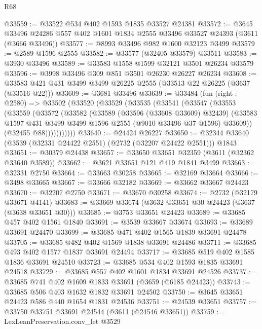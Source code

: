 \begin{lexlean}{R68}
\begin{coremodule}
@33559 := @33522 @534 @402 @1593 @1835 @33527 @24381
@33572 := @3645
    @33496
    @24286
    @557
    @402
    @1601
    @1834
    @2555
    @33496
    @33527
    @24393
    (@3611 (@3666 @33496))
@33577 := @8993 @33496 @982 @1600 @32123 @3499
@33579 := @2589 @1596 @2555
@33582 := @33577 (@32405 @33579) @33511
@33583 := @3930 @33496
@33589 := @33583 @1558 @1599 @32121 @3501 @26234 @33579
@33596 := @3998 @33496 @309 @851 @3501 @26230 @26227 @26234
@33608 := @33583 @421 @431 @3499 @3499 @26225 @2555 (@33513 @22 @26225 (@3637 (@33516 @22)))
@33609 := @3681 @33496
@33639 := @33484
    (fun (right : @2580) =>
    @33502
      (@33520
        (@33529
          (@33535
            (@33541
              (@33547
                (@33553
                  (@33559
                    (@33572
                      (@33582
                        (@33589
                          (@33596 (@33608 @33609) @32439)
                          (@33583
                            @1597
                            @431
                            @3499
                            @3499
                            @1596
                            @2555
                            (@9010 @33496 @37 @1596)
                            @33609))
                        (@32455 @88)))))))))))
@33640 := @24424 @26227
@33650 := @32344 @33640 (@3539 (@32331 @24422 @2551) (@2732 (@32207 @24422 @2551))) @1843
@33651 := @30379 @24438
@33657 := @33650 @33651 @32359 (@3611 (@32362 @33640 @3589))
@33662 := @3621 @33651 @121 @419 @1841 @3499
@33663 := @32331 @2750
@33664 := @33663 @30258
@33665 := @32169 @33664
@33666 := @3498 @33665
@33667 := @33666 @32182
@33669 := @33662 @33667 @24423
@33670 := @32207 @2750
@33671 := @33670 @30258
@33674 := @2732 (@32179 @33671 @4141)
@33683 := @33669 @33674 (@3632 @33651 @30 @24423 (@3637 (@3638 @33651 @30)))
@33685 := @3753 @33651 @24423
@33689 := @33685 @457 @402 @1561 @1840
@33691 := @3539 @33667 @33674
@33693 := @33689 @33691 @24470
@33699 := @33685 @471 @402 @1565 @1839 @33691 @24478
@33705 := @33685 @482 @402 @1569 @1838 @33691 @24486
@33711 := @33685 @493 @402 @1577 @1837 @33691 @24494
@33717 := @33685 @519 @402 @1585 @1836 @33691 @24510
@33723 := @33685 @534 @402 @1593 @1835 @33691 @24518
@33729 := @33685 @557 @402 @1601 @1834 @33691 @24526
@33737 := @33685 @741 @402 @1609 @1833 @33691 (@3659 (@6185 @24423))
@33743 := @33685 @506 @403 @1632 @1832 @33691 @24502
@33750 := @3645 @33651 @24423 @586 @440 @1654 @1831 @24536
@33751 := @24539 @33651
@33757 := @33750 @33751 @33691 @24544 (@3611 (@24546 @33651))
@33759 := LexLeanPreservation.conv_let @3529

\end{coremodule}
\end{lexlean}
